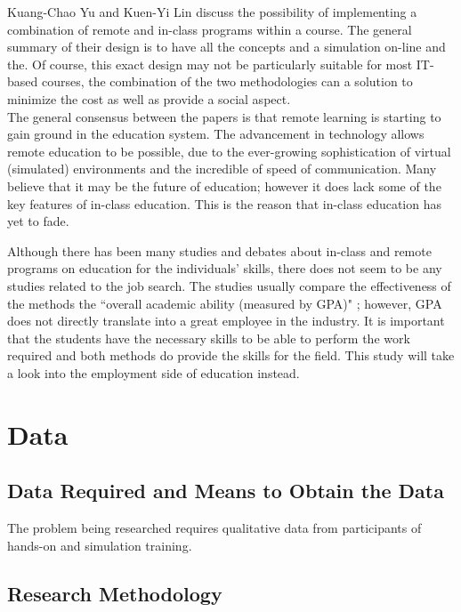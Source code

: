 \documentclass[titlepage]{article}
\begin{document}
\noindent Kuang-Chao Yu and Kuen-Yi Lin \citep{6} discuss the possibility of implementing a
combination of remote and in-class programs within a course.  The general summary of their design
is to have all the concepts and a simulation on-line and the.  Of course, this exact design may not be particularly
suitable for most IT-based courses, the combination of the two methodologies can a solution to
minimize the cost as well as provide a social aspect.\\

\noindent The general consensus between the papers is that remote learning is starting to gain ground
in the education system.  The advancement in technology allows remote education to be possible,
due to the ever-growing sophistication of virtual (simulated) environments and the incredible
of speed of communication.  Many believe that it may be the future of education; however it does
lack some of the key features of in-class education.  This is the reason that in-class education
has yet to fade.\\

\clearpage

\noindent Although there has been many studies and debates about in-class and remote programs on
education for the individuals' skills, there does not seem to be any studies related to the job
search.  The studies usually compare the effectiveness of the methods the ``overall academic ability
(measured by GPA)" \citep{3}; however, GPA does not directly translate into a great employee in
the industry. It is important that the students have the necessary skills to be able to perform
the work required and both methods do provide the skills for the field.  This study will take a
look into the employment side of education instead.

\clearpage

\section{Data}

\subsection{Data Required and Means to Obtain the Data}
The problem being researched requires qualitative data from participants of hands-on
and simulation training.  

\subsection{Research Methodology}
\end{document}
